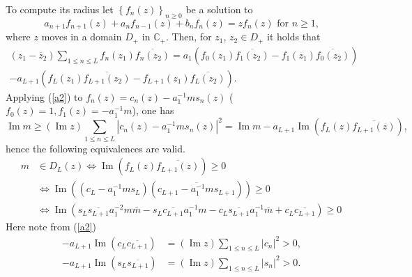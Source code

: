 \documentclass[a4paper]{article}%
\begin{document}
To compute its radius let $\left\{  f_{n}(z)\right\}  _{n\geq0}$ be a solution
to%
\[
a_{n+1}f_{n+1}\left(  z\right)  +a_{n}f_{n-1}\left(  z\right)  +b_{n}%
f_{n}\left(  z\right)  =zf_{n}\left(  z\right)  \text{ for }n\geq1\text{,}%
\]
where $z$ moves in a domain $D_{+}$ in $\mathbb{C}_{+}$. Then, for $z_{1}$,
$z_{2}\in D_{+}$ it holds that%
\begin{gather}
\left(  z_{1}-\overline{z}_{2}\right)  \sum_{1\leq n\leq L}f_{n}\left(
z_{1}\right)  \overline{f_{n}\left(  z_{2}\right)  }=a_{1}\left(  f_{0}\left(
z_{1}\right)  \overline{f_{1}\left(  z_{2}\right)  }-f_{1}\left(
z_{1}\right)  \overline{f_{0}\left(  z_{2}\right)  }\right) \nonumber\\
-a_{L+1}\left(  f_{L}\left(  z_{1}\right)  \overline{f_{L+1}\left(
z_{2}\right)  }-f_{L+1}\left(  z_{1}\right)  \overline{f_{L}\left(
z_{2}\right)  }\right)  \text{.} \label{a2}%
\end{gather}
Applying (\ref{a2}) to $f_{n}(z)=c_{n}(z)-a_{1}^{-1}ms_{n}(z)$ ($f_{0}%
(z)=1,f_{1}(z)=-a_{1}^{-1}m$), one has%
\[
\operatorname{Im}m\geq\left(  \operatorname{Im}z\right)  \sum_{1\leq n\leq
L}\left\vert c_{n}(z)-a_{1}^{-1}ms_{n}(z)\right\vert ^{2}=\operatorname{Im}%
m-a_{L+1}\operatorname{Im}\left(  f_{L}\left(  z\right)  \overline
{f_{L+1}\left(  z\right)  }\right)  \text{,}%
\]
hence the following equivalences are valid.%
\begin{align}
m  &  \in D_{L}(z)\Longleftrightarrow\operatorname{Im}\left(  f_{L}\left(
z\right)  \overline{f_{L+1}\left(  z\right)  }\right)  \geq0\nonumber\\
&  \Longleftrightarrow\operatorname{Im}\left(  \left(  c_{L}-a_{1}^{-1}%
ms_{L}\right)  \left(  \overline{c_{L+1}-a_{1}^{-1}ms_{L+1}}\right)  \right)
\geq0\nonumber\\
&  \Longleftrightarrow\operatorname{Im}\left(  s_{L}\overline{s_{L+1}}%
a_{1}^{-2}m\overline{m}-s_{L}\overline{c_{L+1}}a_{1}^{-1}m-c_{L}%
\overline{s_{L+1}}a_{1}^{-1}\overline{m}+c_{L}\overline{c_{L+1}}\right)  \geq0
\label{a3}%
\end{align}
Here note from (\ref{a2})%
\begin{align*}
-a_{L+1}\operatorname{Im}\left(  c_{L}\overline{c_{L+1}}\right)   &  =\left(
\operatorname{Im}z\right)  \sum_{1\leq n\leq L}\left\vert c_{n}\right\vert
^{2}>0\text{,}\\
-a_{L+1}\operatorname{Im}\left(  s_{L}\overline{s_{L+1}}\right)   &  =\left(
\operatorname{Im}z\right)  \sum_{1\leq n\leq L}\left\vert s_{n}\right\vert
^{2}>0\text{.}%
\end{align*}
\end{document}
